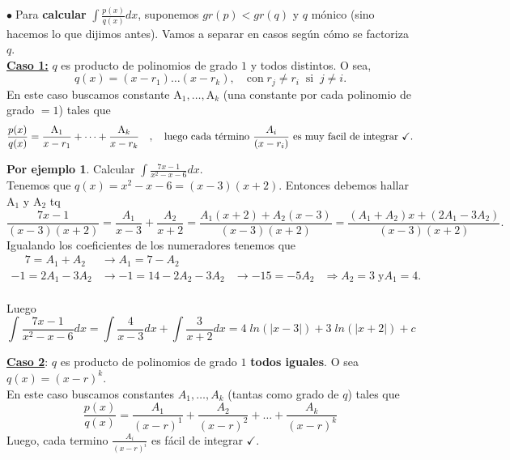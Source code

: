 \documentclass{article}
\theoremstyle{definition}
\newtheorem*{ej}{Por ejemplo}
\theoremstyle{remark}
\newcommand\bl{$\bullet\;$}
\newcommand\ok{\checkmark}
\begin{document}
\bl Para \textbf{calcular} $\int{\frac{p(x)}{q(x)}dx}$, suponemos $gr(p)<gr(q)$ y $q$ mónico (sino hacemos lo que dijimos antes). Vamos a separar en casos según cómo se factoriza $q$. \\

\underline{\textbf{Caso 1:}} $q$ es producto de polinomios de grado $1$ y todos distintos. O sea, \[
q(x)=(x-r_1)\dots(x-r_k),\quad \text{con} \; r_j \neq r_i \; \; \text{si} \; \; j \neq i.\]
En este caso buscamos constante $\text{A}_1, \dots , \text{A}_k$ (una constante por cada polinomio de grado $=1$) tales que \[
\frac{p(x)}{q(x)}=\frac{\text{A}_1}{x-r_1}+ \dots + \frac{\text{A}_k}{x-r_k} \quad,\quad \text{luego cada término $\frac{A_i}{(x-r_i)}$ es muy facil de integrar \ok}.
\]

\begin{ej}
  Calcular $\int{\frac{7x-1}{x^2-x-6}dx}$.\\
  Tenemos que $q(x)=x^2-x-6=(x-3)(x+2).$ Entonces debemos hallar A$_1$ y A$_2$ tq \[
\frac{7x-1}{(x-3)(x+2)}
=
\frac{A_1}{x-3}+\frac{A_2}{x+2}
=
\frac{A_1(x+2)+A_2(x-3)}{(x-3)(x+2)}
=
\frac{(A_1+A_2)x+(2A_1-3A_2)}{(x-3)(x+2)}.
  \]
  Igualando los coeficientes de los numeradores tenemos que\\
  $\begin{array}{llll}
\phantom{-}7=A_1+A_2 & \longrightarrow A_1=7-A_2 & & \\
-1=2A_1-3A_2 & \longrightarrow -1=14-2A_2-3A_2 & \longrightarrow -15 =-5A_2 & \Longrightarrow A_2=3 \; \text{y} A_1 = 4.
  \end{array}$\\\\
Luego
$$\int{\frac{7x-1}{x^2-x-6}dx}
=
\int{\frac{4}{x-3}dx}+\int{\frac{3}{x+2}dx}=4\; ln(|x-3|)+3\; ln (|x+2|)+c$$
\end{ej}

\underline{\textbf{Caso 2}}: $q$ es producto de polinomios de grado $1$ \textbf{todos iguales}. O sea $q(x)=(x-r)^k$. \\
En este caso buscamos constantes $A_1 , \dots , A_k$ (tantas como grado de $q$) tales que \[
\frac{p(x)}{q(x)}
=
\frac{A_1}{(x-r)^1}+\frac{A_2}{(x-r)^2} + \dots + \frac{A_k}{(x-r)^k}
\]
Luego, cada termino $\frac{A_i}{(x-r)^i}$ es fácil de integrar $\ok$.
\end{document}
